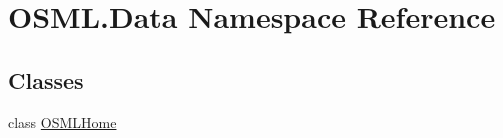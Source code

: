 \hypertarget{namespaceOSML_1_1Data}{}\section{O\+S\+M\+L.\+Data Namespace Reference}
\label{namespaceOSML_1_1Data}
\subsection*{Classes}
\begin{DoxyCompactItemize}
\item 
class \mbox{\hyperlink{classOSML_1_1Data_1_1OSMLHome}{O\+S\+M\+L\+Home}}
\end{DoxyCompactItemize}
